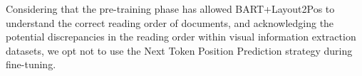 Considering that the pre-training phase has allowed BART+Layout2Pos to understand the correct reading order of documents, and acknowledging the potential discrepancies in the reading order within visual information extraction datasets, we opt not to use the Next Token Position Prediction strategy during fine-tuning.


